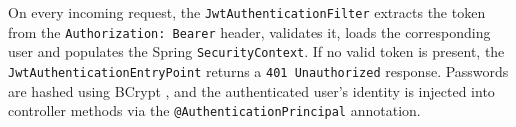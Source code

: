 %
%
%


On every incoming request, the \texttt{JwtAuthenticationFilter} extracts the token from the \texttt{Authorization: Bearer} header, validates it, loads the corresponding user and populates the Spring \texttt{SecurityContext}. If no valid token is present, the \texttt{JwtAuthenticationEntryPoint} returns a \texttt{401 Unauthorized} response. Passwords are hashed using BCrypt \cite{Provos1999}, and the authenticated user's identity is injected into controller methods via the \texttt{@AuthenticationPrincipal} annotation.


